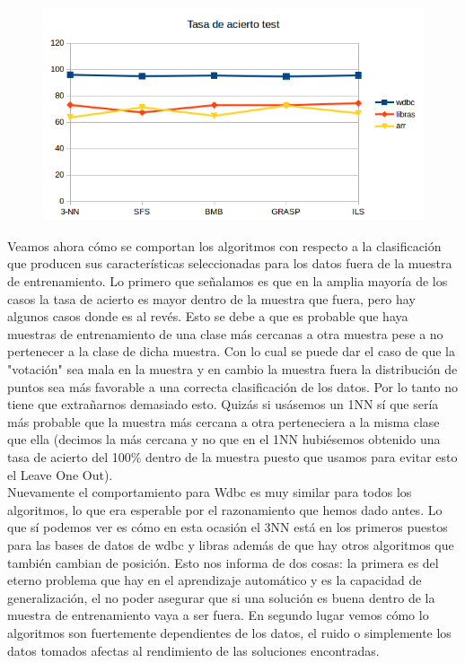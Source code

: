 \documentclass[10pt,a4paper]{article}
\begin{document}
\begin{figure}[H]
\centering
\includegraphics[width=130mm]{tasa_test.png}
\end{figure}

Veamos ahora cómo se comportan los algoritmos con respecto a la clasificación que producen sus características seleccionadas para los datos fuera de la muestra de entrenamiento. Lo primero que señalamos es que en la amplia mayoría de los casos la tasa de acierto es mayor dentro de la muestra que fuera, pero hay algunos casos donde es al revés. Esto se debe a que es probable que haya muestras de entrenamiento de una clase más cercanas a otra muestra pese a no pertenecer a la clase de dicha muestra. Con lo cual se puede dar el caso de que la "votación" sea mala en la muestra y en cambio la muestra fuera la distribución de puntos sea más favorable a una correcta clasificación de los datos. Por lo tanto no tiene que extrañarnos demasiado esto. Quizás si usásemos un 1NN sí que sería más probable que la muestra más cercana a otra perteneciera a la misma clase que ella (decimos la más cercana y no que en el 1NN hubiésemos obtenido una tasa de acierto del 100\% dentro de la muestra puesto que usamos para evitar esto el Leave One Out).\\

Nuevamente el comportamiento para Wdbc es muy similar para todos los algoritmos, lo que era esperable por el razonamiento que hemos dado antes. Lo que sí podemos ver es cómo en esta ocasión el 3NN está en los primeros puestos para las bases de datos de wdbc y libras además de que hay otros algoritmos que también cambian de posición. Esto nos informa de dos cosas: la primera es del eterno problema que hay en el aprendizaje automático y es la capacidad de generalización, el no poder asegurar que si una solución es buena dentro de la muestra de entrenamiento vaya a ser fuera. En segundo lugar vemos cómo lo algoritmos son fuertemente dependientes de los datos, el ruido o simplemente los datos tomados afectas al rendimiento de las soluciones encontradas.\\
\end{document}
